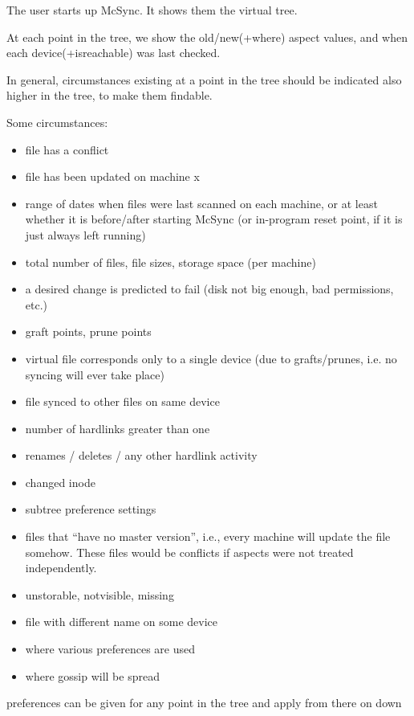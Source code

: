 \documentclass{book}
\begin{document}
The user starts up McSync.  It shows them the virtual tree.

At each point in the tree, we show the old/new(+where) aspect values, and when each device(+isreachable) was last checked.

In general, circumstances existing at a point in the tree should be indicated also higher in the tree, to make them findable.

Some circumstances:
\begin{itemize}
\item file has a conflict
\item file has been updated on machine x
\item range of dates when files were last scanned on each machine, or at least whether it is before/after starting McSync (or in-program reset point, if it is just always left running)
\item total number of files, file sizes, storage space (per machine)
\item a desired change is predicted to fail (disk not big enough, bad permissions, etc.)
\item graft points, prune points
\item virtual file corresponds only to a single device (due to grafts/prunes, i.e. no syncing will ever take place)
\item file synced to other files on same device
\item number of hardlinks greater than one
\item renames / deletes / any other hardlink activity
\item changed inode
\item subtree preference settings
\item files that ``have no master version'', i.e., every machine will update the file somehow.  These files would be conflicts if aspects were not treated independently.
\item unstorable, notvisible, missing
\item file with different name on some device
\item where various preferences are used
\item where gossip will be spread
\end{itemize}

preferences can be given for any point in the tree and apply from there on down
\end{document}
